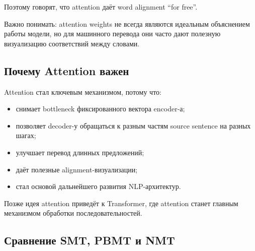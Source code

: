 \documentclass[a4paper,12pt]{article}
\begin{document}
Поэтому говорят, что attention даёт word alignment ``for free''.

Важно понимать: attention weights не всегда являются идеальным объяснением работы модели, но для машинного перевода они часто дают полезную визуализацию соответствий между словами.

\subsection{Почему Attention важен}

Attention стал ключевым механизмом, потому что:

\begin{itemize}
    \item снимает bottleneck фиксированного вектора encoder-а;
    \item позволяет decoder-у обращаться к разным частям source sentence на разных шагах;
    \item улучшает перевод длинных предложений;
    \item даёт полезные alignment-визуализации;
    \item стал основой дальнейшего развития NLP-архитектур.
\end{itemize}

Позже идея attention приведёт к Transformer, где attention станет главным механизмом обработки последовательностей.

\subsection{Сравнение SMT, PBMT и NMT}
\end{document}
